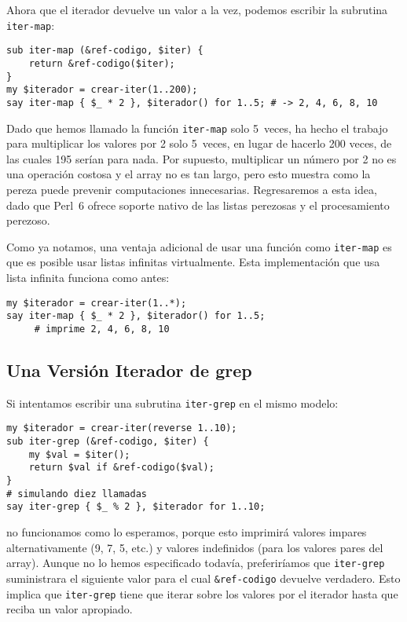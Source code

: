 Ahora que el iterador devuelve un valor a la vez, podemos escribir
la subrutina {\tt iter-map}:

\begin{verbatim}
sub iter-map (&ref-codigo, $iter) {
    return &ref-codigo($iter);
}
my $iterador = crear-iter(1..200);
say iter-map { $_ * 2 }, $iterador() for 1..5; # -> 2, 4, 6, 8, 10
\end{verbatim}

Dado que hemos llamado la función {\tt iter-map} solo 5~veces, 
ha hecho el trabajo para multiplicar los valores por 2 solo 5~veces,
en lugar de hacerlo 200 veces, de las cuales 195 serían para nada.
Por supuesto, multiplicar un número por 2 no es una operación costosa
y el array no es tan largo, pero esto muestra como la pereza puede 
prevenir computaciones innecesarias. Regresaremos a esta idea, dado 
que Perl~6 ofrece soporte nativo de las listas perezosas y el procesamiento
perezoso.

Como ya notamos, una ventaja adicional de usar una función como {\tt iter-map}
es que es posible usar listas infinitas virtualmente. Esta implementación que 
usa lista infinita funciona como antes:

\begin{verbatim}
my $iterador = crear-iter(1..*);
say iter-map { $_ * 2 }, $iterador() for 1..5;
     # imprime 2, 4, 6, 8, 10
\end{verbatim}

\subsection{Una Versión Iterador de grep}

Si intentamos escribir una subrutina {\tt iter-grep} en el mismo 
modelo:

\begin{verbatim}
my $iterador = crear-iter(reverse 1..10);
sub iter-grep (&ref-codigo, $iter) {
    my $val = $iter();
    return $val if &ref-codigo($val);
}
# simulando diez llamadas
say iter-grep { $_ % 2 }, $iterador for 1..10;
\end{verbatim}

no funcionamos como lo esperamos, porque esto imprimirá valores 
impares alternativamente (9, 7, 5, etc.) y valores indefinidos
(para los valores pares del array). Aunque no lo hemos especificado 
todavía, preferiríamos que {\tt iter-grep} suministrara el siguiente
valor para el cual \verb|&ref-codigo| devuelve verdadero. Esto implica 
que {\tt iter-grep} tiene que iterar sobre los valores por el iterador 
hasta que reciba un valor apropiado.

